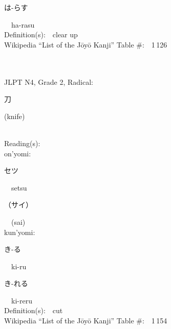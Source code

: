 \begin{multicols}{2}
{\hspace*{2em}}{\begin{CJK}{UTF8}{min} は-らす \end{CJK}}\ \ ha-rasu\ \ \\
Definition(s):\ \ clear up \\
Wikipedia ``List of the J\=oy\=o Kanji'' Table \#:\ \ 1\,126 \\
\ \ \\
{\fontsize{34pt}{40pt}  }\ \ \\  %
{JLPT N4, Grade 2, Radical:\ \ {\begin{CJK}{UTF8}{min} 刀 \end{CJK}} (knife) } \\
Reading(s):\ \ \\
{\hspace*{1em}}on'yomi:\ \ \\
{\hspace*{2em}}{\begin{CJK}{UTF8}{min} セツ \end{CJK}}\ \ setsu\ \ \\
{\hspace*{2em}}{\begin{CJK}{UTF8}{min} （サイ） \end{CJK}}\ \ (sai)\ \ \\
{\hspace*{1em}}kun'yomi:\ \ \\
{\hspace*{2em}}{\begin{CJK}{UTF8}{min} き-る \end{CJK}}\ \ ki-ru\ \ \\
{\hspace*{2em}}{\begin{CJK}{UTF8}{min} き-れる \end{CJK}}\ \ ki-reru\ \ \\
Definition(s):\ \ cut \\
Wikipedia ``List of the J\=oy\=o Kanji'' Table \#:\ \ 1\,154 \\
\ \ \\
{\fontsize{34pt}{40pt}  }\ \ \\  %

\end{multicols}

